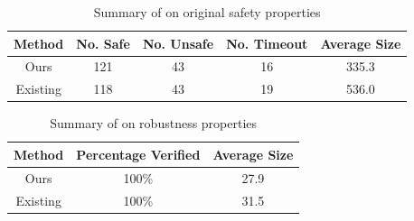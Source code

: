 

\begin{table}
    \centering
        \begin{tabular}{ |c|c|c|c|c| }
        \hline
        Method                   & No. Safe    & No. Unsafe & No. Timeout & Average Size \\ 
        \hline
        Ours                     &   121       & 43         & 16          &  335.3\\
        Existing \cite{cegar-nn} &   118       & 43         & 19          &  536.0\\
        \hline                                                                
        \end{tabular}
        \caption{Summary of \acasxu on original safety properties }
        \label{t:acas-verif}
    \vspace{-1cm}
\end{table}
\begin{table}
    \centering
    \begin{tabular}{ |c|c|c| }
    \hline
    Method                   & Percentage Verified  & Average Size \\ 
    \hline
    Ours                     &   100\%              &  27.9\\
    Existing \cite{cegar-nn} &   100\%              &  31.5\\
    \hline                                                                
    \end{tabular}
    \caption{Summary of \acasxu on robustness properties }
    \label{t:acas-verif-robustness}
\end{table}


